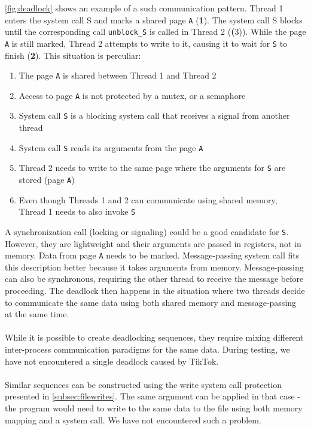 \cref{fig:deadlock} shows an example of a such communication pattern. Thread 1
enters the system call S and marks a shared page \texttt{A} (\textbf{1}). The
system call S blocks until the corresponding call \texttt{unblock\_S} is called
in Thread 2 (\textbf(3)). While the page \texttt{A} is still marked, Thread 2
attempts to write to it, causing it to wait for \texttt{S} to finish
(\textbf{2}). This situation is perculiar:
\begin{enumerate}
    \item The page \texttt{A} is shared between Thread 1 and Thread 2
    \item Access to page \texttt{A} is not protected by a mutex, or a semaphore
    \item System call \texttt{S} is a blocking system call that receives a 
    signal from another thread
    \item System call \texttt{S} reads its arguments from the page \texttt{A}
    \item Thread 2 needs to write to the same page where the arguments for 
    \texttt{S} are stored (page \texttt{A})
    \item Even though Threads 1 and 2 can communicate using shared memory, 
    Thread 1 needs to also invoke \texttt{S}
\end{enumerate}

A synchronization call (locking or signaling) could be a good candidate for
\texttt{S}. However, they are lightweight and their arguments are passed in
registers, not in memory. Data from page \texttt{A} needs to be marked.
Message-passing system call fits this description better because it takes
arguments from memory. Message-passing can also be synchronous, requiring the
other thread to receive the message before proceeding. The deadlock then happens
in the situation where two threads decide to communicate the same data using
both shared memory and message-passing at the same time.
\\
\\
While it is possible to create deadlocking sequences, they require mixing
different inter-process communication paradigms for the same data. During
testing, we have not encountered a single deadlock caused by TikTok.
\\
\\
Similar sequences can be constructed using the write system call protection
presented in \cref{subsec:filewrites}. The same argument can be applied in that
case - the program would need to write to the same data to the file using both
memory mapping and a system call. We have not encountered such a problem.


